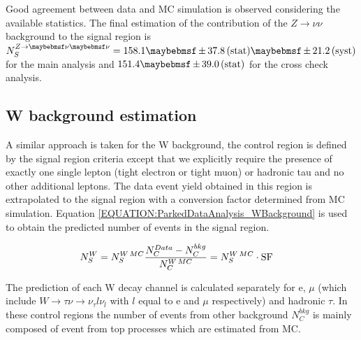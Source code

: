 Good agreement between data and \gls{MC} simulation is observed considering the available statistics. The final estimation of the contribution of the $Z\rightarrow \nu\nu$ background to the signal region is $N_{S}^{Z\rightarrow\nu\nu}= 158.1 \pm 37.8 \stat \pm 21.2 \syst$ for the main analysis and $151.4 \pm 39.0 \stat$ for the cross check analysis. 

\subsection{W background estimation}
\label{SECTION:ParkedDataAnalysis_ControlRegions_WBackground}


A similar approach is taken for the W background, the control region is defined by the signal region criteria except that we explicitly require the presence of exactly one single lepton (tight electron or tight muon) or hadronic tau and no other additional leptons. The data event yield obtained in this region is extrapolated to the signal region with a conversion factor determined from \gls{MC} simulation. Equation \ref{EQUATION:ParkedDataAnalysis_WBackground} is used to obtain the predicted number of events in the signal region.

\begin{align}
N_{S}^{W}&=N_{S}^{W\,MC}\frac{N_{C}^{Data}-N_{C}^{bkg}}{N_{C}^{W\,MC}}=N_{S}^{W\,MC}\cdot \rm{SF}
\label{EQUATION:ParkedDataAnalysis_WBackground}
\end{align}

The prediction of each W decay channel is calculated separately for e, $\mu$ (which include $W\rightarrow\tau\nu\rightarrow \nu_\tau l\nu_l$ with $l$ equal to e and $\mu$ respectively) and hadronic $\tau$. In these control regions the number of events from other background $N_{C}^{bkg}$ is mainly composed of event from top processes which are estimated from \gls{MC}.

